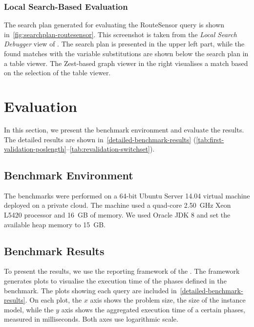 \documentclass[submission,copyright,creativecommons]{eptcs}
\begin{document}
\subsubsection{Local Search-Based Evaluation}

The search plan generated for evaluating the \textsf{RouteSensor} query is shown in~\autoref{fig:searchplan-routesensor}. This screenshot is taken from the \emph{Local Search Debugger} view of \eiq. The search plan is presented in the upper left part, while the found matches with the variable substitutions are shown below the search plan in a table viewer. The Zest-based graph viewer in the right visualises a match based on the selection of the table viewer.


\section{Evaluation}

In this section, we present the benchmark environment and evaluate the results. The detailed results are shown in~\autoref{detailed-benchmark-results} (\autoref{tab:first-validation-poslength}--\autoref{tab:revalidation-switchset}).

\subsection{Benchmark Environment}

The benchmarks were performed on a 64-bit Ubuntu Server 14.04 virtual machine deployed on a private cloud. The machine used a quad-core 2.50~GHz Xeon L5420 processor and 16~GB of memory. We used Oracle JDK 8 and set the available heap memory to 15~GB.

\subsection{Benchmark Results}
\label{benchmark-results}

To present the results, we use the reporting framework of the \tb. The framework generates plots to visualise the execution time of the phases defined in the benchmark. %
The plots showing each query are included in~\autoref{detailed-benchmark-results}. On each plot, the $x$ axis shows the problem size, \ie the size of the instance model, while the $y$ axis shows the aggregated execution time of a certain phases, measured in milliseconds. Both axes use logarithmic scale.
\end{document}
